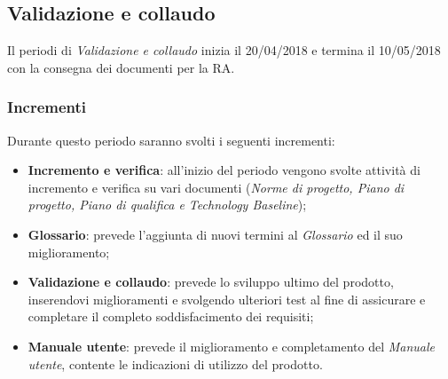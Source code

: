 \subsection{Validazione e collaudo}
Il periodi di \textit{Validazione e collaudo} inizia il 20/04/2018 e termina il 10/05/2018 con la consegna dei documenti per la RA. 

\subsubsection{Incrementi}
Durante questo periodo saranno svolti i seguenti incrementi:
\begin{itemize}
	\item \textbf{Incremento e verifica}: all'inizio del periodo vengono svolte attività di incremento e verifica su vari documenti (\textit{Norme di progetto, Piano di progetto, Piano di qualifica e Technology Baseline});
	\item \textbf{Glossario}: prevede l'aggiunta di nuovi termini al \textit{Glossario} ed il suo miglioramento;
	\item \textbf{Validazione e collaudo}: prevede lo sviluppo ultimo del prodotto, inserendovi miglioramenti e svolgendo ulteriori test al fine di assicurare e completare il completo soddisfacimento dei requisiti;
	\item \textbf{Manuale utente}: prevede il miglioramento e completamento del \textit{Manuale utente}, contente le indicazioni di utilizzo del prodotto.
\end{itemize}



